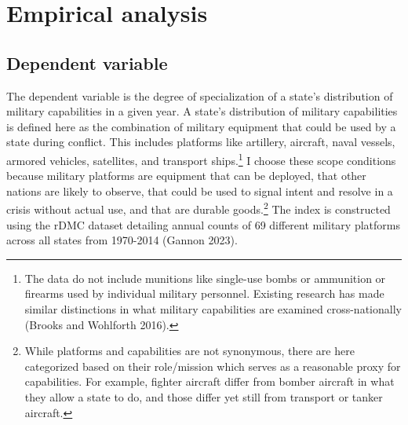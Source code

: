 \documentclass[
  12,
  letterpaper,
  DIV=11,
  numbers=noendperiod]{scrartcl}
\begin{document}
\hypertarget{sec-empirics}{%
\section{Empirical analysis}\label{sec-empirics}}

\hypertarget{dependent-variable}{%
\subsection{Dependent variable}\label{dependent-variable}}

The dependent variable is the degree of specialization of a state's
distribution of military capabilities in a given year. A state's
distribution of military capabilities is defined here as the combination
of military equipment that could be used by a state during conflict.
This includes platforms like artillery, aircraft, naval vessels, armored
vehicles, satellites, and transport ships.\footnote{The data do not
  include munitions like single-use bombs or ammunition or firearms used
  by individual military personnel. Existing research has made similar
  distinctions in what military capabilities are examined
  cross-nationally (Brooks and Wohlforth 2016).} I choose these scope
conditions because military platforms are equipment that can be
deployed, that other nations are likely to observe, that could be used
to signal intent and resolve in a crisis without actual use, and that
are durable goods.\footnote{While platforms and capabilities are not
  synonymous, there are here categorized based on their role/mission
  which serves as a reasonable proxy for capabilities. For example,
  fighter aircraft differ from bomber aircraft in what they allow a
  state to do, and those differ yet still from transport or tanker
  aircraft.} The index is constructed using the rDMC dataset detailing
annual counts of 69 different military platforms across all states from
1970-2014 (Gannon 2023).
\end{document}
